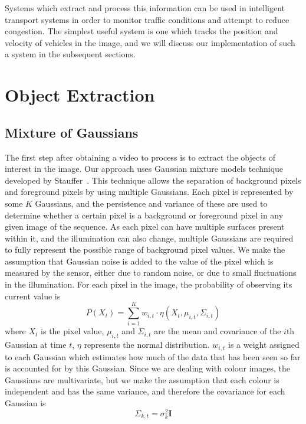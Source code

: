 \documentclass[conference]{IEEEtran}
\begin{document}
Systems which extract and process this information can be used in intelligent
transport systems in order to monitor traffic conditions and attempt to reduce
congestion. The simplest useful system is one which tracks the position and
velocity of vehicles in the image, and we will discuss our implementation of
such a system in the subsequent sections.
\section{Object Extraction}
\subsection{Mixture of Gaussians}
The first step after obtaining a video to process is to extract the objects of
interest in the image. Our approach uses Gaussian mixture models technique
developed by Stauffer~\cite{stauffer1999adaptive}. This technique allows the
separation of background pixels and foreground pixels by using multiple
Gaussians. Each pixel is represented by some $K$ Gaussians, and the persistence
and variance of these are used to determine whether a certain pixel is a
background or foreground pixel in any given image of the sequence. As each pixel
can have multiple surfaces present within it, and the illumination can also
change, multiple Gaussians are required to fully represent the possible range of
background pixel values. We make the assumption that Gaussian noise is added to
the value of the pixel which is measured by the sensor, either due to random
noise, or due to small fluctuations in the illumination. For each pixel in the
image, the probability of observing its current value is~\cite{stauffer1999adaptive}
\begin{equation}
  P(X_t)=\sum_{i=1}^Kw_{i,t}\cdot\eta(X_t,\mu_{i,t},\Sigma_{i,t})
\end{equation}
where $X_t$ is the pixel value, $\mu_{i,t}$ and $\Sigma_{i,t}$ are the mean and
covariance of the $i$th Gaussian at time $t$, $\eta$ represents the normal
distribution. $w_{i,t}$ is a weight assigned to each Gaussian which estimates
how much of the data that has been seen so far is accounted for by this
Gaussian. Since we are dealing with colour images, the Gaussians are
multivariate, but we make the assumption that each colour is independent and has
the same variance, and therefore the covariance for each Gaussian is
\begin{equation}
  \Sigma_{k,t}= \sigma_k^2\mathbf{I}
\end{equation}
\end{document}

